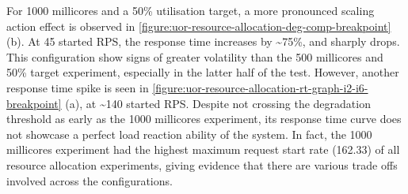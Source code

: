 For 1000 millicores and a 50\% utilisation target, a more pronounced scaling action effect is observed in \ref{figure:uor-resource-allocation-deg-comp-breakpoint} (b). At 45 started RPS, the response time increases by \textasciitilde75\%, and sharply drops. This configuration show signs of greater volatility than the 500 millicores and 50\% target experiment, especially in the latter half of the test. However, another response time spike is seen in \ref{figure:uor-resource-allocation-rt-graph-i2-i6-breakpoint} (a), at \textasciitilde140 started RPS. Despite not crossing the degradation threshold as early as the 1000 millicores experiment, its response time curve does not showcase a perfect load reaction ability of the system. In fact, the 1000 millicores experiment had the highest maximum request start rate (162.33) of all resource allocation experiments, giving evidence that there are various trade offs involved across the configurations.

